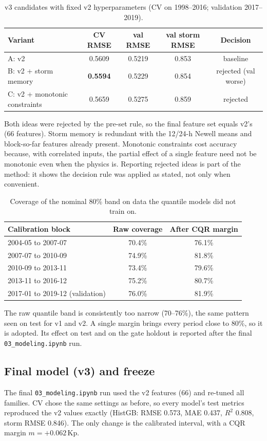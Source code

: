 \documentclass[11pt,a4paper]{article}
\newcommand{\code}[1]{\texttt{#1}}
\begin{document}
\begin{table}[H]\centering
\caption{v3 candidates with fixed v2 hyperparameters (CV on 1998--2016; validation 2017--2019).}\label{tab:v3var}
\begin{tabular}{lcccc}\toprule
Variant & CV RMSE & val RMSE & val storm RMSE & Decision\\\midrule
A: v2 & 0.5609 & 0.5219 & 0.853 & baseline\\
B: v2 + storm memory & \textbf{0.5594} & 0.5229 & 0.854 & rejected (val worse)\\
C: v2 + monotonic constraints & 0.5659 & 0.5275 & 0.859 & rejected\\\bottomrule
\end{tabular}
\end{table}

Both ideas were rejected by the pre-set rule, so the final feature set equals v2's (66 features). Storm memory
is redundant with the 12/24-h Newell means and block-so-far features already present. Monotonic constraints cost
accuracy because, with correlated inputs, the partial effect of a single feature need not be monotonic even when the
physics is. Reporting rejected ideas is part of the method: it shows the decision rule was applied as stated, not
only when convenient.

\begin{table}[H]\centering
\caption{Coverage of the nominal 80\% band on data the quantile models did not train on.}\label{tab:cqr}
\begin{tabular}{lcc}\toprule
Calibration block & Raw coverage & After CQR margin\\\midrule
2004-05 to 2007-07 & 70.4\% & 76.1\%\\
2007-07 to 2010-09 & 74.9\% & 81.8\%\\
2010-09 to 2013-11 & 73.4\% & 79.6\%\\
2013-11 to 2016-12 & 75.2\% & 80.7\%\\
2017-01 to 2019-12 (validation) & 76.0\% & 81.9\%\\\bottomrule
\end{tabular}
\end{table}
The raw quantile band is consistently too narrow (70--76\%), the same pattern seen on test for v1 and v2. A single
margin brings every period close to 80\%, so it is adopted. Its effect on test and on the gate holdout is reported
after the final \code{03\_modeling.ipynb} run.

\subsection{Final model (v3) and freeze}
The final \code{03\_modeling.ipynb} run used the v2 features (66) and re-tuned all families. CV chose the same
settings as before, so every model's test metrics reproduced the v2 values exactly (HistGB: RMSE 0.573, MAE 0.437,
$R^2$ 0.808, storm RMSE 0.846). The only change is the calibrated interval, with a CQR margin $m = +0.062$\,Kp.
\end{document}
